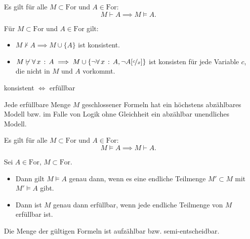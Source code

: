 \documentclass{cheat-sheet}
\newcommand{\For}{\mathrm{For}} %
\newcommand{\subst}[2]{\nicefrac{#1}{#2}} %
\begin{document}

\begin{satz}[Korrektheit]
  Es gilt für alle $M \subset \For$ und $A \in \For$:
  \[ M \vdash A \implies M \models A. \]
\end{satz}

\begin{lem}
  Für $M \subset \For$ und $A \in \For$ gilt:
  \begin{itemize}
    \item $M \not\vdash A \implies M \cup \{ A \}$ ist konsistent.
    \item $M \not\vdash \fa{x} A \implies M \cup \{ \neg \fa{x} A, \neg A[\subst{c}{x}] \}$ ist konsisten für jede Variable $c$, die nicht in $M$ und $A$ vorkommt.
  \end{itemize}
\end{lem}

\begin{lem}
  konsistent $\iff$ erfüllbar
\end{lem}

\begin{satz}
  Jede erfüllbare Menge $M$ geschlossener Formeln hat ein höchstens abzählbares Modell bzw. im Falle von Logik ohne Gleichheit ein abzählbar unendliches Modell.
\end{satz}

\begin{satz}[Vollständigkeit]
  Es gilt für alle $M \subset \For$ und $A \in \For$:
  \[ M \models A \implies M \vdash A. \]
\end{satz}

\begin{satz}
  Sei $A \in \For$, $M \subset \For$.
  \begin{itemize}
    \item Dann gilt $M \models A$ genau dann, wenn es eine endliche Teilmenge $M' \subset M$ mit $M' \models A$ gibt.
    \item Dann ist $M$ genau dann erfüllbar, wenn jede endliche Teilmenge von $M$ erfüllbar ist.
  \end{itemize}
\end{satz}

\begin{bem}
  Die Menge der gültigen Formeln ist aufzählbar bzw. semi-entscheidbar.
\end{bem}
\end{document}
